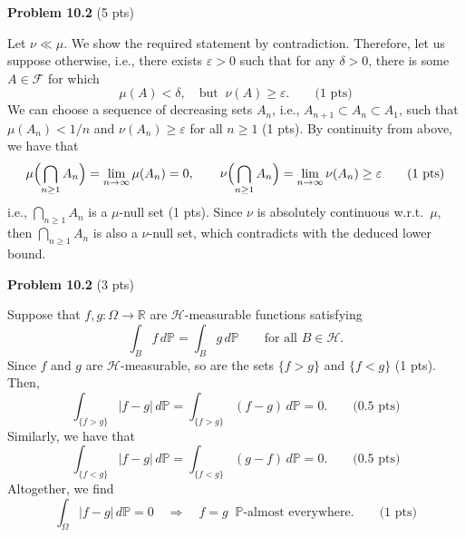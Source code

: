 \textbf{Problem 10.2} (5 pts)

Let $\nu\ll \mu$. We show the required statement by contradiction. Therefore, let us suppose otherwise, i.e., there exists $\varepsilon>0$ such that for any $\delta>0$, there is some $A\in\mathcal{F}$ for which
\[
	\mu(A)<\delta,\quad\text{but}\;\;\nu(A)\ge \varepsilon.\qquad\text{(1 pts)}
\]
We can choose a sequence of decreasing sets $A_n$, i.e., $A_{n+1}\subset A_n\subset A_1$, such that $\mu(A_n)<1/n$ and $\nu(A_n)\ge \varepsilon$ for all $n\ge 1$ (1 pts). By continuity from above, we have that
\[
	\mu\Bigl(\bigcap_{n\ge 1} A_n\Bigr) = \lim_{n\to\infty} \mu(A_n) = 0,\qquad \nu\Bigl(\bigcap_{n\ge 1} A_n\Bigr) = \lim_{n\to\infty} \nu(A_n) \ge \varepsilon\qquad \text{(1 pts)}
\]
i.e., $\bigcap_{n\ge 1} A_n$ is a $\mu$-null set (1 pts). Since $\nu$ is absolutely continuous w.r.t.\ $\mu$, then $\bigcap_{n\ge 1} A_n$ is also a $\nu$-null set, which contradicts with the deduced lower bound. 

\bigskip
\textbf{Problem 10.2} (3 pts)

Suppose that $f,g:\Omega\to\mathbb{R}$ are $\mathcal{H}$-measurable functions satisfying
\[
	\int_B f\,d\mathbb{P} = \int_B g\,d\mathbb{P} \qquad\text{for all $B\in\mathcal{H}$}.
\]
Since $f$ and $g$ are $\mathcal{H}$-measurable, so are the sets $\{f>g\}$ and $\{f<g\}$ (1 pts). Then,
\[
	\int_{\{f>g\}} |f-g| \,d\mathbb{P} = \int_{\{f>g\}} (f-g) \,d\mathbb{P} = 0.\qquad \text{(0.5 pts)}
\]
Similarly, we have that
\[
	\int_{\{f<g\}} |f-g| \,d\mathbb{P} = \int_{\{f<g\}} (g-f) \,d\mathbb{P} = 0.\qquad \text{(0.5 pts)}
\]
Altogether, we find
\[
	\int_\Omega |f-g| \,d\mathbb{P} = 0\quad\Longrightarrow\quad f=g\;\;\text{$\mathbb{P}$-almost everywhere.}\qquad \text{(1 pts)}
\]






